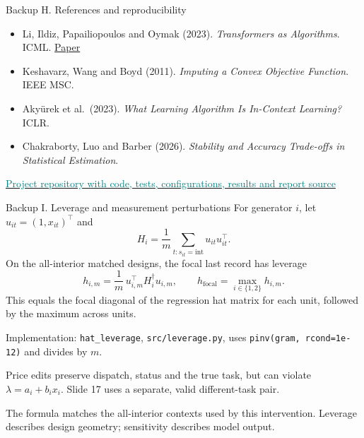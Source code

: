 \documentclass[aspectratio=169,11pt]{beamer}
\newcommand{\source}[1]{\par\vfill{\color{muted}\tiny #1}}
\begin{document}
\begin{frame}[noframenumbering]{Backup H. References and reproducibility}
\footnotesize
\begin{itemize}
\setlength{\itemsep}{3mm}
\item Li, Ildiz, Papailiopoulos and Oymak (2023).
\emph{Transformers as Algorithms}. ICML.
\href{https://proceedings.mlr.press/v202/li23l.html}{Paper}
\item Keshavarz, Wang and Boyd (2011).
\emph{Imputing a Convex Objective Function}. IEEE MSC.
\item Aky\"urek et al.\ (2023).
\emph{What Learning Algorithm Is In-Context Learning?} ICLR.
\item Chakraborty, Luo and Barber (2026).
\emph{Stability and Accuracy Trade-offs in Statistical Estimation}.
\end{itemize}
\vspace{4mm}
\href{https://github.com/feizhanguwaterloo/Stability-and-Information-Sensitivity-in-Transformer-In-Context-Inverse-Learning}
{\textcolor{teal}{Project repository with code, tests, configurations, results and report source}}
\end{frame}

\begin{frame}[noframenumbering]{Backup I. Leverage and measurement perturbations}
\small
For generator \(i\), let \(u_{it}=(1,x_{it})^\top\) and
\[
H_i=\frac1m\sum_{t:s_{it}=\mathrm{int}}u_{it}u_{it}^{\top}.
\]
On the all-interior matched designs, the focal last record has leverage
\[
h_{i,m}=\frac1m\,u_{i,m}^{\top}H_i^\dagger u_{i,m},
\qquad
h_{\mathrm{focal}}=\max_{i\in\{1,2\}}h_{i,m}.
\]
This equals the focal diagonal of the regression hat matrix for each unit,
followed by the maximum across units.
\vspace{3mm}

Implementation: \texttt{hat\_leverage}, \texttt{src/leverage.py},
uses \texttt{pinv(gram, rcond=1e-12)} and divides by \(m\).
\vspace{3mm}

Price edits preserve dispatch, status and the true task, but can violate
\(\lambda=a_i+b_ix_i\). Slide 17 uses a separate, valid different-task pair.
\source{The formula matches the all-interior contexts used by this intervention.
Leverage describes design geometry; sensitivity describes model output.}
\end{frame}
\end{document}
